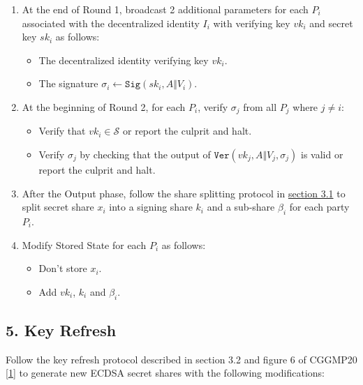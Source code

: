\documentclass[
]{article}
\providecommand{\tightlist}{%
  \setlength{\itemsep}{0pt}\setlength{\parskip}{0pt}}
\begin{document}
\begin{enumerate}
\def\labelenumi{\arabic{enumi}.}
\tightlist
\item
  At the end of Round 1, broadcast 2 additional parameters for each
  \(P_i\) associated with the decentralized identity \(I_i\) with
  verifying key \(vk_i\) and secret key \(sk_i\) as follows:

  \begin{itemize}
  \tightlist
  \item
    The decentralized identity verifying key \(vk_i\).
  \item
    The signature
    \(\sigma _i \leftarrow \mathtt{Sig}(sk_i, A \Vert V_i)\).
  \end{itemize}
\item
  At the beginning of Round 2, for each \(P_i\), verify \(\sigma _j\)
  from all \(P_j\) where \(j \neq i\):

  \begin{itemize}
  \tightlist
  \item
    Verify that \(vk_i \in \mathcal{S}\) or report the culprit and halt.
  \item
    Verify \(\sigma _j\) by checking that the output of
    \(\mathtt{Ver}(vk_j, A \Vert V_j, \sigma _j)\) is valid or report
    the culprit and halt.
  \end{itemize}
\item
  After the Output phase, follow the share splitting protocol in
  \protect\hyperlink{share-splitting}{section 3.1} to split secret share
  \(x_i\) into a signing share \(k_i\) and a sub-share \(\beta _i\) for
  each party \(P_i\).
\item
  Modify Stored State for each \(P_i\) as follows:

  \begin{itemize}
  \tightlist
  \item
    Don't store \(x_i\).
  \item
    Add \(vk_i\), \(k_i\) and \(\beta _i\).
  \end{itemize}
\end{enumerate}

\hypertarget{key-refresh}{%
\subsection{5. Key Refresh}\label{key-refresh}}

Follow the key refresh protocol described in section 3.2 and figure 6 of
CGGMP20 {[}\protect\hyperlink{ref-cggmp20}{1}{]} to generate new ECDSA
secret shares with the following modifications:
\end{document}
